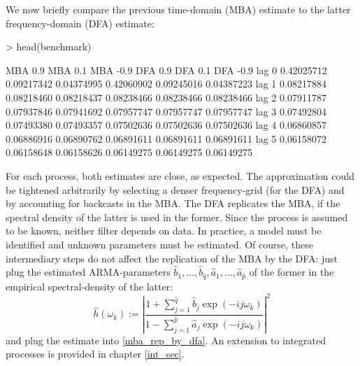 \documentclass[a4paper]{book}
\begin{document}
\begin{Schunk}
\end{Schunk}
We now briefly compare the previous time-domain (MBA) estimate to the latter frequency-domain (DFA) estimate:
\begin{Schunk}
\begin{Sinput}
> head(benchmark)
\end{Sinput}
\begin{Soutput}
         MBA 0.9    MBA 0.1   MBA -0.9    DFA 0.9    DFA 0.1   DFA -0.9
lag 0 0.42025712 0.09217342 0.04374995 0.42060902 0.09245016 0.04387223
lag 1 0.08217884 0.08218460 0.08218437 0.08238466 0.08238466 0.08238466
lag 2 0.07911787 0.07937846 0.07941692 0.07957747 0.07957747 0.07957747
lag 3 0.07492804 0.07493380 0.07493357 0.07502636 0.07502636 0.07502636
lag 4 0.06860857 0.06886916 0.06890762 0.06891611 0.06891611 0.06891611
lag 5 0.06158072 0.06158648 0.06158626 0.06149275 0.06149275 0.06149275
\end{Soutput}
\end{Schunk}
For each process, both estimates are close, as expected. The approximation could be tightened arbitrarily by selecting a denser frequency-grid (for the DFA) and by accounting for backcasts in the MBA. The DFA replicates the MBA, if the spectral density of the latter is used in the former. Since the process is assumed to be known, neither filter depends on data. In practice, a model must be identified and unknown parameters must be estimated. Of course, these intermediary steps do not affect the replication of the MBA by the DFA: just plug the estimated ARMA-parameters $\hat{b}_1,...,\hat{b}_{\hat{q}},\hat{a}_1,...,\hat{a}_{\hat{p}}$ of the former in the empirical spectral-density of the latter:
\[\hat{h}(\omega_k):=\left|\frac{1+\sum_{j=1}^{\hat{q}}\hat{b}_j\exp(-ij\omega_k)}{1-\sum_{j=1}^{\hat{p}}\hat{a}_j\exp(-ij\omega_k)}\right|^2\]
and plug the estimate into \ref{mba_rep_by_dfa}. An extension to integrated processes is provided in chapter \ref{int_sec}.
\end{document}
